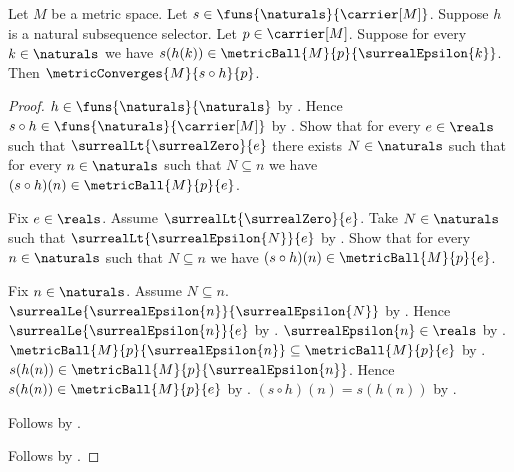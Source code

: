 \begin{lemma}\label{metric_subsequence_converges_from_epsilon_balls}
    Let $M$ be a metric space.
    Let $s\in\funs{\naturals}{\carrier[M]}$.
    Suppose $h$ is a natural subsequence selector.
    Let $p\in\carrier[M]$.
    Suppose for every $k\in\naturals$ we have
        $s(h(k))\in\metricBall{M}{p}{\surrealEpsilon{k}}$.
    Then $\metricConverges{M}{s\circ h}{p}$.
\end{lemma}
\begin{proof}
    $h\in\funs{\naturals}{\naturals}$ by
        .
    Hence $s\circ h\in\funs{\naturals}{\carrier[M]}$ by
        .
    Show that for every $e\in\reals$ such that
        $\surrealLt{\surrealZero}{e}$ there exists $N\in\naturals$
        such that for every $n\in\naturals$ such that $N\subseteq n$
            we have $(s\circ h)(n)\in\metricBall{M}{p}{e}$.
    \begin{subproof}
        Fix $e\in\reals$.
        Assume $\surrealLt{\surrealZero}{e}$.
        Take $N\in\naturals$ such that
            $\surrealLt{\surrealEpsilon{N}}{e}$ by
            .
        Show that for every $n\in\naturals$ such that $N\subseteq n$
            we have $(s\circ h)(n)\in\metricBall{M}{p}{e}$.
        \begin{subproof}
            Fix $n\in\naturals$.
            Assume $N\subseteq n$.
            $\surrealLe{\surrealEpsilon{n}}{\surrealEpsilon{N}}$ by
                .
            Hence $\surrealLe{\surrealEpsilon{n}}{e}$ by
                .
            $\surrealEpsilon{n}\in\reals$ by
                .
            $\metricBall{M}{p}{\surrealEpsilon{n}}
                \subseteq\metricBall{M}{p}{e}$ by
                .
            $s(h(n))\in\metricBall{M}{p}{\surrealEpsilon{n}}$.
            Hence $s(h(n))\in\metricBall{M}{p}{e}$ by
                .
            $(s\circ h)(n)=s(h(n))$ by
                .
        \end{subproof}
        Follows by \auto.
    \end{subproof}
    Follows by .
\end{proof}

